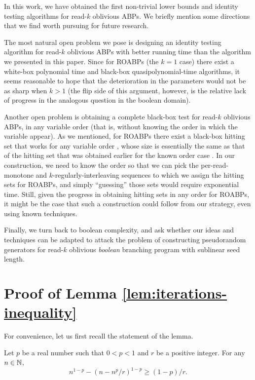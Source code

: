 \documentclass[11pt]{article}
\begin{document}
In this work, we have obtained the first non-trivial lower bounds and identity testing algorithms for read-$k$ oblivious ABPs. We briefly mention some directions that we find worth pursuing for future research.

The most natural open problem we pose is designing an identity testing algorithm for read-$k$ oblivious ABPs with better running time than the algorithm we presented in this paper. Since for ROABPs (the $k=1$ case) there exist a white-box polynomial time and black-box quasipolynomial-time algorithms, it seems reasonable to hope that the deterioration in the parameters would not be as sharp when $k>1$ (the flip side of this argument, however, is the relative lack of progress in the analogous question in the boolean domain).

Another open problem is obtaining a complete black-box test for read-$k$ oblivious ABPs, in any variable order (that is, without knowing the order in which the variable appear). As we mentioned, for ROABPs there exist a black-box hitting set that works for any variable order \cite{agks15}, whose size is essentially the same as that of the hitting set that was obtained earlier for the known order case \cite{FS13}. In our construction, we need to know the order so that we can pick the per-read-monotone and $k$-regularly-interleaving sequences to which we assign the hitting sets for ROABPs, and simply ``guessing'' those sets would require exponential time. Still, given the progress in obtaining hitting sets in any order for ROABPs, it might be the case that such a construction could follow from our strategy, even using known techniques.

Finally, we turn back to boolean complexity, and ask whether our ideas and techniques can be adapted to attack the problem of constructing pseudorandom generators for read-$k$ oblivious {\em boolean} branching program with sublinear seed length.


 

\appendix

\section{Proof of Lemma \ref{lem:iterations-inequality}}
\label{app:iterations-inequality}

For convenience, let us first recall the statement of the lemma.

\begin{lemma}
Let $p$ be a real number such that $0<p<1$ and $r$ be a positive integer. For any $n \in \N$,
\[
n^{1-p} - (n-n^p/r)^{1-p} \ge (1-p)/r.
\]
\end{lemma}
\end{document}
